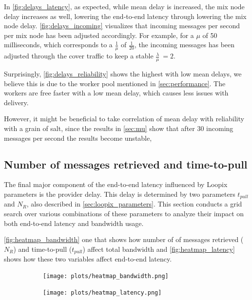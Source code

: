\documentclass[a4paper,11pt,oneside]{report}
\begin{document}
In \autoref{fig:delays_latency}, as expected, while mean delay is increased, the mix node delay increases as well, lowering the end-to-end latency through lowering the mix node delay. \autoref{fig:delays_incoming} visualizes that incoming messages per second per mix node has been adjusted accordingly. For example, for a \(\mu\) of 50 milliseconds, which corresponds to a \(\frac{1}{\mu}\) of \(\frac{1}{20}\), the incoming messages has been adjusted through the cover traffic to keep a stable \(\frac{\lambda}{\mu}\ = 2 \).

Surprisingly, \autoref{fig:delays_reliability} shows the highest with low mean delays, we believe this is due to the worker pool mentioned in \autoref{sec:performance}. The workers are free faster with a low mean delay, which causes less issues with delivery.

However, it might be beneficial to take correlation of mean delay with reliability with a grain of salt, since the results in \autoref{sec:mu} show that after 30 incoming messages per second the results become unstable, 

\subsection{Number of messages retrieved and time-to-pull }
\label{sec:grid_search}

The final major component of the end-to-end latency influenced by Loopix parameters is the provider delay. This delay is determined by two parameters \(t_{pull}\) and \(N_R\), also described in \autoref{sec:loopix_parameters}. This section conducts a grid search over various combinations of these parameters to analyze their impact on both end-to-end latency and bandwidth usage.

\autoref{fig:heatmap_bandwidth} one that shows how number of of messages retrieved (\(N_R\)) and time-to-pull (\(t_{pull}\)) affect total bandwidth and \autoref{fig:heatmap_latency} shows how these two variables affect end-to-end latency.

\begin{figure}[H]
    \centering
    \begin{subfigure}{0.49\textwidth}
        \centering
        \texttt{[image: plots/heatmap\_bandwidth.png]}
        \caption{}
        \label{fig:heatmap_bandwidth}
    \end{subfigure}
    \hfill
    \centering
    \begin{subfigure}{0.49\textwidth}
        \centering
        \texttt{[image: plots/heatmap\_latency.png]}
        \caption{}
        \label{fig:heatmap_latency}
    \end{subfigure}
\end{figure}
\end{document}
